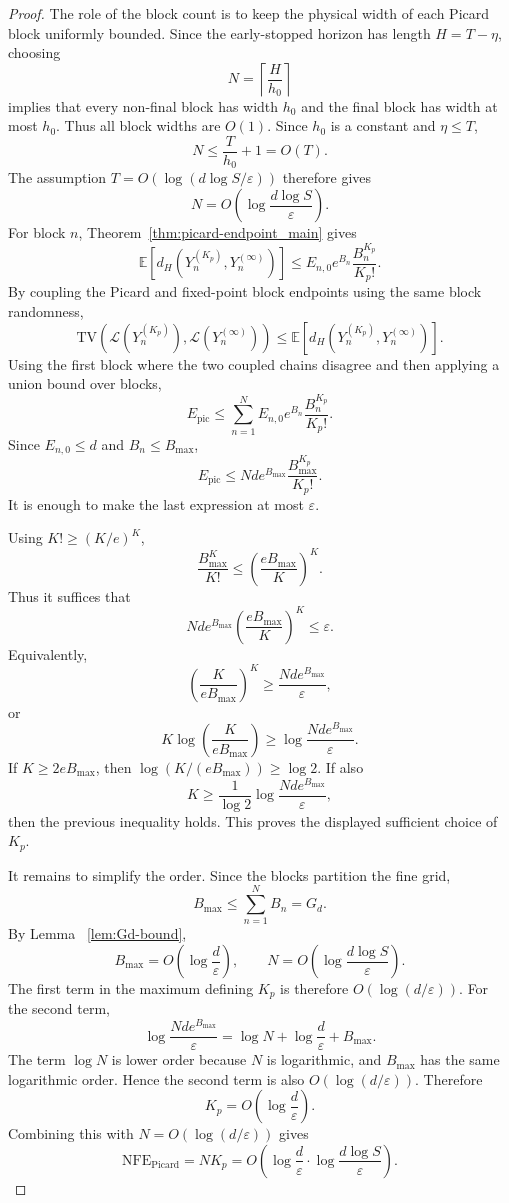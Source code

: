 \documentclass{article}
\newcommand{\TV}{\mathrm{TV}}
\newcommand{\Law}{\mathcal{L}}
\newcommand{\NFE}{\mathrm{NFE}}
\begin{document}
\begin{proof}
The role of the block count is to keep the physical width of each Picard block uniformly bounded. Since the early-stopped horizon has length $H=T-\eta$, choosing
\[
N=\left\lceil \frac{H}{h_0}\right\rceil
\]
implies that every non-final block has width $h_0$ and the final block has width at most $h_0$. Thus all block widths are $O(1)$. Since $h_0$ is a constant and $\eta\le T$,
\[
N\le \frac{T}{h_0}+1=O(T).
\]
The assumption $T=O(\log(d\log S/\varepsilon))$ therefore gives
\[
N=O\left(\log\frac {d\log S}{\varepsilon}\right).
\]
For block $n$, Theorem~\ref{thm:picard-endpoint_main} gives
\[
\mathbb E[d_H(Y_n^{(K_p)},Y_n^{(\infty)})]
\le
E_{n,0}e^{B_n}\frac{B_n^{K_p}}{K_p!}.
\]
By coupling the Picard and fixed-point block endpoints using the same block randomness,
\[
\TV(\Law(Y_n^{(K_p)}),\Law(Y_n^{(\infty)}))
\le
\mathbb E[d_H(Y_n^{(K_p)},Y_n^{(\infty)})].
\]
Using the first block where the two coupled chains disagree and then applying a union bound over blocks,
\[
E_{\mathrm{pic}}
\le
\sum_{n=1}^N E_{n,0}e^{B_n}\frac{B_n^{K_p}}{K_p!}.
\]
Since $E_{n,0}\le d$ and $B_n\le B_{\max}$,
\[
E_{\mathrm{pic}}
\le
Nd e^{B_{\max}}\frac{B_{\max}^{K_p}}{K_p!}.
\]
It is enough to make the last expression at most $\varepsilon$.

Using $K!\ge(K/e)^K$,
\[
\frac{B_{\max}^K}{K!}
\le
\left(\frac{eB_{\max}}{K}\right)^K.
\]
Thus it suffices that
\[
Nd e^{B_{\max}}\left(\frac{eB_{\max}}{K}\right)^K
\le
\varepsilon.
\]
Equivalently,
\[
\left(\frac{K}{eB_{\max}}\right)^K
\ge
\frac{Nd e^{B_{\max}}}{\varepsilon},
\]
or
\[
K\log\left(\frac{K}{eB_{\max}}\right)
\ge
\log\frac{Nd e^{B_{\max}}}{\varepsilon}.
\]
If $K\ge2eB_{\max}$, then $\log(K/(eB_{\max}))\ge\log2$. If also
\[
K\ge \frac{1}{\log2}\log\frac{Nd e^{B_{\max}}}{\varepsilon},
\]
then the previous inequality holds. This proves the displayed sufficient choice of $K_p$.

It remains to simplify the order. Since the blocks partition the fine grid,
\[
B_{\max}\le \sum_{n=1}^N B_n=G_d.
\]
By Lemma ~\ref{lem:Gd-bound},
\[
B_{\max}=O\left(\log\frac d{\varepsilon}\right),
\qquad
N=O\left(\log\frac {d\log S}{\varepsilon}\right).
\]
The first term in the maximum defining $K_p$ is therefore $O(\log(d/\varepsilon))$. For the second term,
\[
\log\frac{Nd e^{B_{\max}}}{\varepsilon}
=
\log N+
\log\frac d{\varepsilon}+B_{\max}.
\]
The term $\log N$ is lower order because $N$ is logarithmic, and $B_{\max}$ has the same logarithmic order. Hence the second term is also $O(\log(d/\varepsilon))$. Therefore
\[
K_p=O\left(\log\frac d{\varepsilon}\right).
\]
Combining this with $N=O(\log(d/\varepsilon))$ gives
\[
\NFE_{\mathrm{Picard}}=NK_p=O\left(\log\frac d{\varepsilon}\cdot \log\frac {d\log S}{\varepsilon} \right).
\]
\end{proof}
\end{document}
